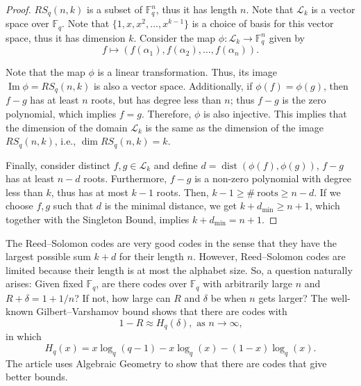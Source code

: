 \documentclass[11pt, oneside]{amsart}
\theoremstyle{definition}
\theoremstyle{remark}
\numberwithin{equation}{section}
\DeclareMathOperator{\dist}{dist}
\DeclareMathOperator{\Ima}{Im}
\DeclareMathOperator{\dimension}{dim}
\begin{document}
\begin{proof}
	$RS_q(n, k)$ is a subset of $\mathbb{F}_q^n$, thus it has length $n$.  
	Note that $ \mathcal L_k$ is a vector space over $\mathbb{F}_q$.
	Note that $\{1, x, x^2, \dots, x^{k-1}\}$ is a choice of basis for this vector space, thus it has dimension $k$.
	Consider the map $\phi:  \mathcal L_k \to \mathbb{F}_q^n$ given by 
	\begin{equation}
		f \mapsto (f(\alpha_1), f(\alpha_2), \dots, f(\alpha_n)).
	\end{equation}

	Note that the map $\phi$ is a linear transformation.
	Thus, its image $\Ima \phi = RS_q(n, k)$ is also a vector space.  
	Additionally, if $\phi(f) = \phi(g)$, then $f - g$ has at least $n$ roots, but has degree less than $n$; thus $f - g$ is the zero polynomial, which implies $f = g$.
	Therefore, $\phi$ is also injective.
	This implies that the dimension of the domain $ \mathcal L_k$ is the same as the dimension of the image $RS_q(n, k)$, i.e.,  $\dimension RS_q(n, k) = k$.
	
	Finally, consider distinct $f, g \in  \mathcal L_k$ and define $d = \dist(\phi(f), \phi(g))$, $f - g$ has at least $n - d$ roots.
	Furthermore, $f - g$ is a non-zero polynomial with degree less than $k$, thus has at most $k - 1$ roots.
	Then,  $ k - 1 \ge \#\ \text{roots} \ge n - d$.
	If we choose $f, g$ such that $d$ is the minimal distance, we get $k + d_{\mathrm{min}} \ge n + 1$, which together with the Singleton Bound, implies $k + d_\text{min} = n + 1$.
\end{proof}

The Reed--Solomon codes are very good codes in the sense that they have the largest possible sum $k + d$ for their length $n$.
However, Reed--Solomon codes are limited because their length is at most the alphabet size.
So, a question naturally arises: Given fixed $\mathbb{F}_q$, are there codes over $\mathbb{F}_q$ with arbitrarily large $n$ and $R + \delta = 1 + 1/n$?
If not, how large can $R$ and $\delta$ be when $n$ gets larger?
The well-known Gilbert--Varshamov bound shows that there are codes with 
\begin{equation}
	1 - R \approx H_q(\delta), \text{ as $n \to \infty$,}
\end{equation}
in which
\begin{equation}
	H_q(x) = x \log_q(q-1) - x\log_q(x) - (1-x)\log_q(x).
\end{equation}
The article \cite{TVZ82} uses Algebraic Geometry to show that there are codes that give better bounds.
\end{document}
